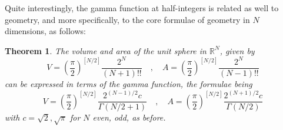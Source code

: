 \documentclass[12pt]{amsbook}
\newtheorem{theorem}{Theorem}[chapter]
\begin{document}
Quite interestingly, the gamma function at half-integers is related as well to geometry, and more specifically, to the core formulae of geometry in $N$ dimensions, as follows:


\begin{theorem}
The volume and area of the unit sphere in $\mathbb R^N$, given by
$$V=\left(\frac{\pi}{2}\right)^{[N/2]}\frac{2^N}{(N+1)!!}\quad,\quad 
A=\left(\frac{\pi}{2}\right)^{[N/2]}\frac{2^N}{(N-1)!!}$$
can be expressed in terms of the gamma function, the formulae being
$$V=\left(\frac{\pi}{2}\right)^{[N/2]}\frac{2^{(N-1)/2}c}{\Gamma(N/2+1)}\quad,\quad 
A=\left(\frac{\pi}{2}\right)^{[N/2]}\frac{2^{(N+1)/2}c}{\Gamma(N/2)}$$
with $c=\sqrt{2},\sqrt{\pi}$ for $N$ even, odd, as before.
\end{theorem}
\end{document}
